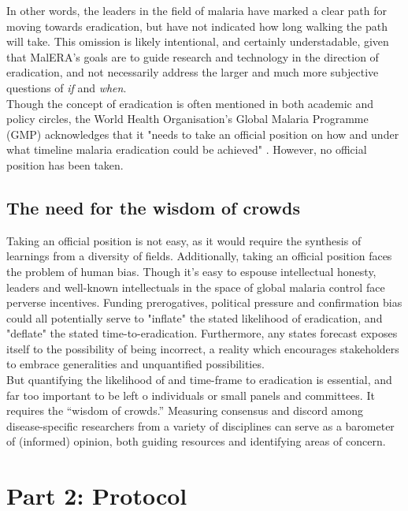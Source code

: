 \documentclass{article}
\begin{document}
\noindent In other words, the leaders in the field of malaria have marked a clear path for moving towards eradication, but have not indicated how long walking the path will take. This omission is likely intentional, and certainly understadable, given that MalERA's goals are to guide research and technology in the direction of eradication, and not necessarily address the larger and much more subjective questions of \emph{if} and \emph{when}.  \\

\noindent Though the concept of eradication is often mentioned in both academic and policy circles\cite{Mnzava2014, WHO2016}, the World Health Organisation's Global Malaria Programme (GMP) acknowledges that it "needs to take an official position on how and under what timeline malaria eradication could be achieved" \cite{WHO2015}. However, no official position has been taken.

\subsection*{The need for the wisdom of crowds}


\noindent Taking an official position is not easy, as it would require the synthesis of learnings from a diversity of fields.   Additionally, taking an official position faces the problem of human bias. Though it's easy to espouse intellectual honesty, leaders and well-known intellectuals in the space of global malaria control face perverse incentives. Funding prerogatives, political pressure and confirmation bias could all potentially serve to "inflate" the stated likelihood of eradication, and "deflate" the stated time-to-eradication. Furthermore, any states forecast exposes itself to the possibility of being incorrect, a reality which encourages stakeholders to embrace generalities and unquantified possibilities. \\


\noindent But quantifying the likelihood of and time-frame to eradication is essential, and far too important to be left o individuals or small panels and committees. It requires the “wisdom of crowds.” Measuring consensus and discord among disease-specific researchers from a variety of disciplines can serve as a barometer of (informed) opinion, both guiding resources and identifying areas of concern. \\


\newpage
\section*{Part 2: Protocol}
\end{document}
